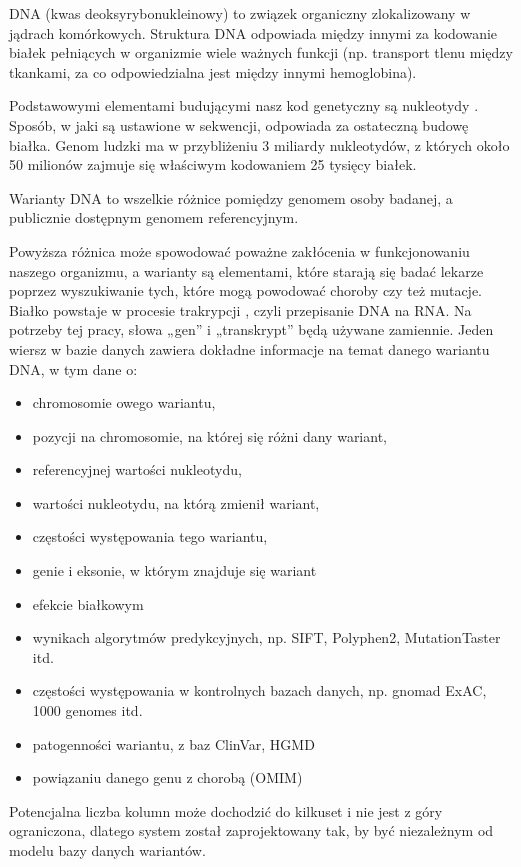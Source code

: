 \documentclass[a4paper,12pt,twoside]{article}
\begin{document}
DNA (kwas deoksyrybonukleinowy) \cite{dna} to związek organiczny zlokalizowany w jądrach komórkowych.
Struktura DNA odpowiada między innymi za kodowanie białek \cite{geneticCode} \cite{dnaStrucDiv}  pełniących w organizmie wiele ważnych funkcji (np. transport tlenu między tkankami, za co
odpowiedzialna jest między innymi hemoglobina).

Podstawowymi elementami budującymi nasz kod genetyczny są
nukleotydy \cite{nukleotydy} \cite{nucleicAcids}. Sposób, w jaki są ustawione w sekwencji, odpowiada
za ostateczną budowę białka. Genom ludzki ma w przybliżeniu 3 miliardy
nukleotydów, z których około 50 milionów zajmuje się właściwym kodowaniem
25 tysięcy białek.

Warianty DNA to wszelkie różnice pomiędzy genomem osoby badanej,
a publicznie dostępnym genomem referencyjnym.

Powyższa różnica może spowodować poważne
zakłócenia w funkcjonowaniu naszego organizmu, a warianty
są elementami, które starają się badać
lekarze poprzez wyszukiwanie tych, które mogą powodować choroby
czy też mutacje.
Białko powstaje w procesie trakrypcji \cite{transkrypcja}, czyli przepisanie DNA na RNA.
Na potrzeby tej pracy, słowa „gen” i „transkrypt” będą używane zamiennie.
Jeden wiersz w bazie danych zawiera dokładne informacje na temat danego wariantu DNA, w tym dane o:

\begin{itemize}
\item chromosomie owego wariantu,
\item pozycji na chromosomie, na której się różni dany wariant,
\item referencyjnej wartości nukleotydu,
\item wartości nukleotydu, na którą zmienił wariant,
\item częstości występowania tego wariantu,
\item genie i eksonie, w którym znajduje się wariant
\item efekcie białkowym
\item wynikach algorytmów predykcyjnych, np. SIFT, Polyphen2, MutationTaster itd.
\item częstości występowania w kontrolnych bazach danych, np. gnomad ExAC, 1000 genomes itd.
\item patogenności wariantu, z baz ClinVar, HGMD
\item powiązaniu danego genu z chorobą (OMIM)
\end{itemize}

Potencjalna liczba kolumn może dochodzić do kilkuset
i nie jest z góry ograniczona, dlatego system został zaprojektowany tak, by być niezależnym od modelu bazy danych wariantów.
\newpage
\end{document}
